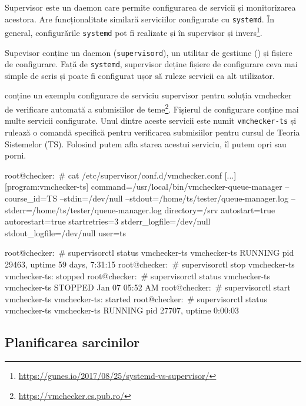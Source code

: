 Supervisor este un daemon care permite configurarea de servicii și monitorizarea acestora.
Are funcționalitate similară serviciilor configurate cu \texttt{systemd}.
În general, configurările \texttt{systemd} pot fi realizate și în supervisor și invers\footnote{\url{https://gunes.io/2017/08/25/systemd-vs-supervisor/}}.

Supevisor conține un daemon (\texttt{supervisord}), un utilitar de gestiune () și fișiere de configurare.
Față de \texttt{systemd}, supervisor deține fișiere de configurare ceva mai simple de scris și poate fi configurat ușor să ruleze servicii ca alt utilizator.

 conține un exemplu configurare de serviciu supervisor pentru soluția vmchecker de verificare automată a submisiilor de teme\footnote{\url{https://vmchecker.cs.pub.ro/}}.
Fișierul de configurare  conține mai multe servicii configurate.
Unul dintre aceste servicii este numit \texttt{vmchecker-ts} și rulează o comandă specifică pentru verificarea submisiilor pentru cursul de Teoria Sistemelor (TS).
Folosind  putem afla starea acestui serviciu, îl putem opri sau porni.

\begin{screen}[caption={Configurare supervisor},label={lst:auto:supervisor}]
root@checker:~# cat /etc/supervisor/conf.d/vmchecker.conf
[...]
[program:vmchecker-ts]
command=/usr/local/bin/vmchecker-queue-manager --course_id=TS --stdin=/dev/null --stdout=/home/ts/tester/queue-manager.log --stderr=/home/ts/tester/queue-manager.log
directory=/srv
autostart=true
autorestart=true
startretries=3
stderr_logfile=/dev/null
stdout_logfile=/dev/null
user=ts

root@checker:~# supervisorctl status vmchecker-ts
vmchecker-ts                     RUNNING    pid 29463, uptime 59 days, 7:31:15
root@checker:~# supervisorctl stop vmchecker-ts
vmchecker-ts: stopped
root@checker:~# supervisorctl status vmchecker-ts
vmchecker-ts                     STOPPED    Jan 07 05:52 AM
root@checker:~# supervisorctl start vmchecker-ts
vmchecker-ts: started
root@checker:~# supervisorctl status vmchecker-ts
vmchecker-ts                     RUNNING    pid 27707, uptime 0:00:03
\end{screen}

\subsection{Planificarea sarcinilor}
\label{sec:auto:system:sched}

